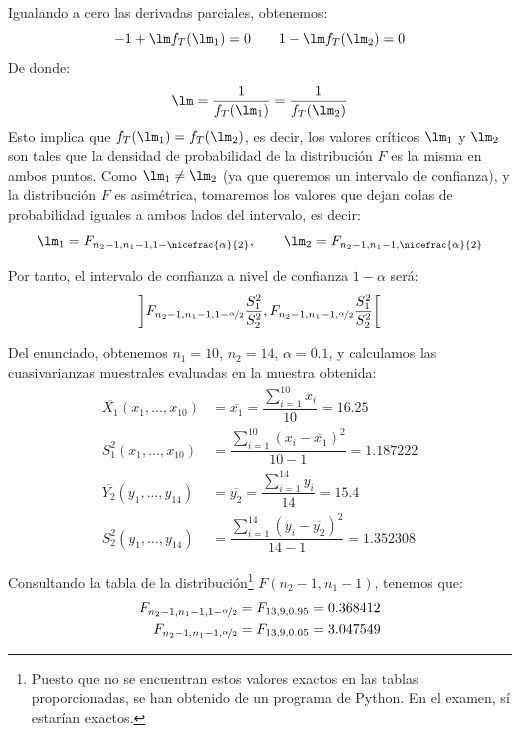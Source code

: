 \begin{ejercicio}
    Igualando a cero las derivadas parciales, obtenemos:
    \begin{equation*}
        -1+\lm f_T(\lm_1) = 0 \qquad 1-\lm f_T(\lm_2) = 0
    \end{equation*}
    De donde:
    \begin{equation*}
        \lm = \frac{1}{f_T(\lm_1)} = \frac{1}{f_T(\lm_2)}
    \end{equation*}
    Esto implica que $f_T(\lm_1) = f_T(\lm_2)$, es decir, los valores críticos $\lm_1$ y $\lm_2$ son tales que la densidad de probabilidad de la distribución $F$ es la misma en ambos puntos. Como $\lm_1\neq \lm_2$ (ya que queremos un intervalo de confianza), y la distribución $F$ es asimétrica, tomaremos los valores que dejan colas de probabilidad iguales a ambos lados del intervalo, es decir:
    \begin{equation*}
        \lm_1 = F_{n_2-1,n_1-1,1-\nicefrac{\alpha}{2}}, \qquad \lm_2 = F_{n_2-1,n_1-1,\nicefrac{\alpha}{2}}
    \end{equation*}

    Por tanto, el intervalo de confianza a nivel de confianza $1-\alpha$ será:
    \begin{equation*}
        \left]F_{n_2-1,n_1-1,1-\nicefrac{\alpha}{2}}\frac{S_1^2}{S_2^2},F_{n_2-1,n_1-1,\nicefrac{\alpha}{2}}\frac{S_1^2}{S_2^2} \right[
    \end{equation*}

    Del enunciado, obtenemos $n_1 = 10$, $n_2 = 14$, $\alpha = 0.1$, y calculamos las cuasivarianzas muestrales evaluadas en la muestra obtenida:
    \begin{align*}
        \overline{X_1}(x_1, \ldots, x_{10}) &= \overline{x_1} = \dfrac{\sum\limits_{i=1}^{10} x_i}{10} = 16.25 \\
        S_1^2(x_1, \ldots, x_{10}) &= \dfrac{\sum\limits_{i=1}^{10} (x_i-\overline{x_1})^2}{10-1} = 1.187222 \\
        \overline{Y_2}(y_1, \ldots, y_{14}) &= \overline{y_2} = \dfrac{\sum\limits_{i=1}^{14} y_i}{14} = 15.4 \\
        S_2^2(y_1, \ldots, y_{14}) &= \dfrac{\sum\limits_{i=1}^{14} (y_i-\overline{y_2})^2}{14-1} = 1.352308
    \end{align*}

    Consultando la tabla de la distribución\footnote{Puesto que no se encuentran estos valores exactos en las tablas proporcionadas, se han obtenido de un programa de Python. En el examen, sí estarían exactos.} $F(n_2-1,n_1-1)$, tenemos que:
    \begin{align*}
        F_{n_2-1,n_1-1,1-\nicefrac{\alpha}{2}} &= F_{13,9,0.95} = 0.368412 \\
        F_{n_2-1,n_1-1,\nicefrac{\alpha}{2}} &= F_{13,9,0.05} = 3.047549
    \end{align*}


\end{ejercicio}
